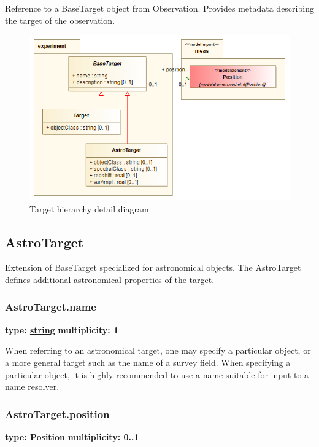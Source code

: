   Reference to a BaseTarget object from Observation. Provides metadata
  describing the target of the observation.
  
\pagebreak
\begin{figure}[h]
\begin{center}
  \includegraphics[width=5.0in]{diagrams/Target.png}
  \caption{ Target hierarchy detail diagram}\label{fig:target}
\end{center}
\end{figure}
  
\subsection{AstroTarget}
\label{sect:astrotarget}

  Extension of BaseTarget specialized for astronomical objects. The AstroTarget
  defines additional astronomical properties of the target.

  \subsubsection{AstroTarget.name}
  \textbf{type: \hyperref[sect:ivoa]{string}} \newline
  \textbf{multiplicity: 1} \newline

  When referring to an astronomical target, one may specify a particular
  object, or a more general target such as the name of a survey field. When
  specifying a particular object, it is highly recommended to use a name
  suitable for input to a name resolver.
  
  \subsubsection{AstroTarget.position}
  \textbf{type: \hyperref[sect:pos]{Position}} \newline
  \textbf{multiplicity: 0..1} \newline

